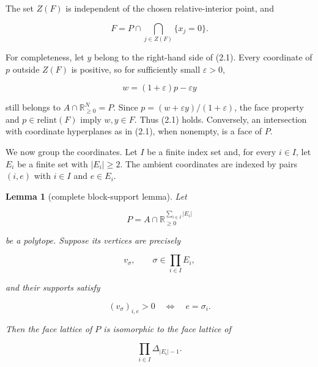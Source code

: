 \documentclass[11pt]{article}
\newtheorem{lemma}[theorem]{Lemma}
\theoremstyle{remark}
\numberwithin{equation}{section}
\begin{document}
The set $Z(F)$ is independent of the chosen relative-interior point, and

\nopagebreak[4]
\[
F=P\cap\bigcap_{j\in Z(F)}\{x_j=0\}.
\tag{2.1}
\]

For completeness, let $y$ belong to the right-hand side of (2.1). Every
coordinate of $p$ outside $Z(F)$ is positive, so for sufficiently small
$\varepsilon>0$,

\nopagebreak[4]
\[
w=(1+\varepsilon)p-\varepsilon y
\]

still belongs to $A\cap\mathbb R^N_{\geq0}=P$. Since
$p=(w+\varepsilon y)/(1+\varepsilon)$, the face property and
$p\in\mathrm{relint}(F)$ imply $w,y\in F$. Thus (2.1) holds. Conversely,
an intersection with coordinate hyperplanes as in (2.1), when nonempty, is a
face of $P$.

We now group the coordinates. Let $I$ be a finite index set and, for every
$i\in I$, let $E_i$ be a finite set with $|E_i|\geq2$. The ambient coordinates
are indexed by pairs $(i,e)$ with $i\in I$ and $e\in E_i$.

\Needspace{0.32\textheight}
\begin{lemma}[complete block-support lemma]

Let

\nopagebreak[4]
\[
P=A\cap\mathbb R_{\geq0}^{\sum_{i\in I}|E_i|}
\]

be a polytope. Suppose its vertices are precisely

\nopagebreak[4]
\[
v_\sigma,
\qquad
\sigma\in\prod_{i\in I}E_i,
\]

and their supports satisfy

\nopagebreak[4]
\[
(v_\sigma)_{i,e}>0
\quad\Longleftrightarrow\quad
e=\sigma_i.
\tag{2.2}
\]

Then the face lattice of $P$ is isomorphic to the face lattice of

\nopagebreak[4]
\[
\prod_{i\in I}\Delta_{|E_i|-1}.
\]

\end{lemma}
\end{document}
